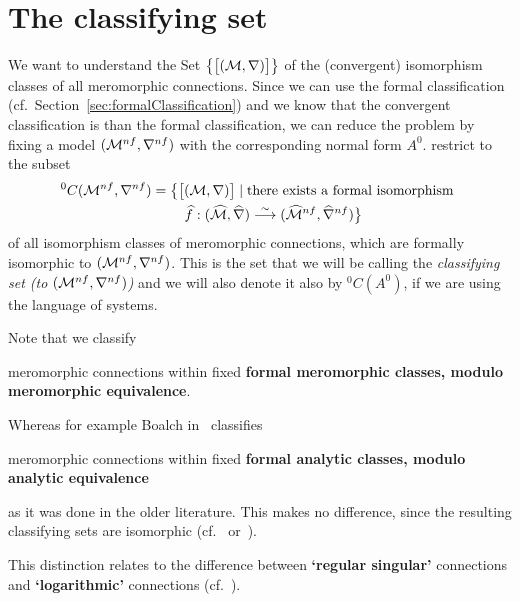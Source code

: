 \section{The classifying set}\label{sec:classifyingSet}
We want to understand the Set
$\bigl\{\big[(\mathcal{M},\nabla)\big]\bigr\}$ of the (convergent)
isomorphism classes of all meromorphic connections. Since we can use the formal
classification (cf.\ Section~\ref{sec:formalClassification}) and we know that
the convergent classification is  than the formal classification,
we can reduce the problem by fixing a model $(\mathcal{M}^{nf},\nabla^{nf})$ with the
corresponding normal form $A^0$.
 restrict to the subset
\begin{multline*}
  {}^0C(\mathcal{M}^{nf},\nabla^{nf})=\bigl\{
    \bigl[(\mathcal{M},\nabla)\bigr]
    \mid \text{there exists a formal isomorphism }
  \\\qquad\widehat f:(\widehat{\mathcal{M}},\widehat\nabla)
      \overset{\sim}\longrightarrow
      (\widehat{\mathcal{M}}^{nf},\widehat\nabla^{nf})
  \bigr\}
\end{multline*}
of all isomorphism classes of meromorphic connections, which are formally
isomorphic to $(\mathcal{M}^{nf},\nabla^{nf})$. This is the set that we will be
calling the \emph{classifying set (to $(\mathcal{M}^{nf},\nabla^{nf})$)} and we will
also denote it also by ${}^0C(A^0)$, if we are using the language of systems.
\begin{rem}
  Note that we classify
  \begin{einr}
    meromorphic connections within fixed \textbf{formal meromorphic classes,
    modulo meromorphic equivalence}.
  \end{einr}
  Whereas for example Boalch in~\cite{boalch,thboalch} classifies
  \begin{einr}
    meromorphic connections within fixed \textbf{formal analytic classes,
    modulo analytic equivalence}
  \end{einr}
  as it was done in the older literature.
  This makes no difference, since the resulting classifying sets are isomorphic
  (cf.~\cite{thboalch} or~\cite{babbitt1989local}).

  This distinction relates to the difference between \textbf{‘regular
  singular’} connections and \textbf{‘logarithmic’} connections
  (cf.~\cite[Rem.1.41]{thboalch}).
\end{rem}

